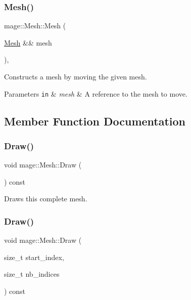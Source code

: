 \subsubsection{\texorpdfstring{Mesh()}{Mesh()}\hspace{0.1cm}{\footnotesize\ttfamily [4/4]}}
{\footnotesize\ttfamily mage\+::\+Mesh\+::\+Mesh (\begin{DoxyParamCaption}\item[{\hyperlink{classmage_1_1_mesh}{Mesh} \&\&}]{mesh }\end{DoxyParamCaption})\hspace{0.3cm}{\ttfamily [protected]}, {\ttfamily [default]}}

Constructs a mesh by moving the given mesh.


\begin{DoxyParams}[1]{Parameters}
\mbox{\tt in}  & {\em mesh} & A reference to the mesh to move. \\
\hline
\end{DoxyParams}


\subsection{Member Function Documentation}
\hypertarget{classmage_1_1_mesh_a62f7b8176f7747f2b4db7674524a146c}{}\label{classmage_1_1_mesh_a62f7b8176f7747f2b4db7674524a146c} 
\subsubsection{\texorpdfstring{Draw()}{Draw()}\hspace{0.1cm}{\footnotesize\ttfamily [1/2]}}
{\footnotesize\ttfamily void mage\+::\+Mesh\+::\+Draw (\begin{DoxyParamCaption}{ }\end{DoxyParamCaption}) const}

Draws this complete mesh. \hypertarget{classmage_1_1_mesh_ae1f71bddbb1fa3b45cec55f0fe920c7d}{}\label{classmage_1_1_mesh_ae1f71bddbb1fa3b45cec55f0fe920c7d} 
\subsubsection{\texorpdfstring{Draw()}{Draw()}\hspace{0.1cm}{\footnotesize\ttfamily [2/2]}}
{\footnotesize\ttfamily void mage\+::\+Mesh\+::\+Draw (\begin{DoxyParamCaption}\item[{size\+\_\+t}]{start\+\_\+index,  }\item[{size\+\_\+t}]{nb\+\_\+indices }\end{DoxyParamCaption}) const}

